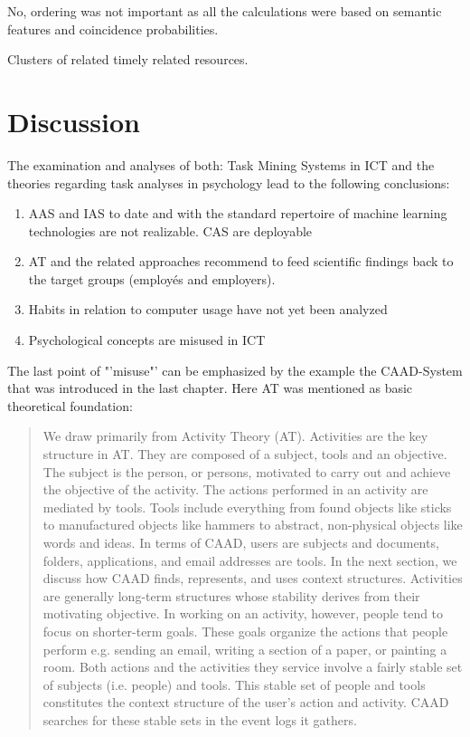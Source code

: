 
No, ordering was not important as all the calculations were based on semantic features and coincidence probabilities. 


Clusters of related timely related resources.

\section{Discussion}
\label{discussion_related}
The examination and analyses of both: Task Mining Systems in \ac{ICT} and the theories regarding task analyses in psychology lead to the following conclusions:
\begin{enumerate}
  \item \ac{AAS} and \ac{IAS} to date and with the standard repertoire of machine learning technologies are not realizable. \ac{CAS} are deployable
  \item \ac{AT} and the related approaches recommend to feed scientific findings back to the target groups (employés and employers). 
  \item Habits in relation to computer usage have not yet been analyzed
  \item Psychological concepts are misused in \ac{ICT}
\end{enumerate}

The last point of "'misuse"' can be emphasized by the example the CAAD-System that was introduced in the last chapter. Here \ac{AT} was mentioned as basic theoretical foundation:
\begin{quotation}
We draw primarily from Activity Theory (AT). Activities are the key structure in AT. They are composed of a subject, tools and an objective. The subject is the person, or persons, motivated to carry out and achieve the objective of the activity. The actions performed in an activity are mediated by tools. Tools include everything from found objects like sticks to manufactured objects like hammers to abstract, non-physical objects like words and ideas. In terms of CAAD, users are subjects and documents, folders, applications, and email addresses are tools. In the next section, we discuss how CAAD finds, represents, and uses context structures. Activities are generally long-term structures whose stability derives from their motivating objective. In working on an activity, however, people tend to focus on shorter-term goals. These goals organize the actions that people perform e.g. sending an email, writing a section of a paper, or painting a room. Both actions and the activities they service involve a fairly stable set of subjects (i.e. people) and tools. This stable set of people and tools constitutes the context structure of the user’s action and activity. CAAD searches for these stable sets in the event logs it gathers.
\end{quotation}

